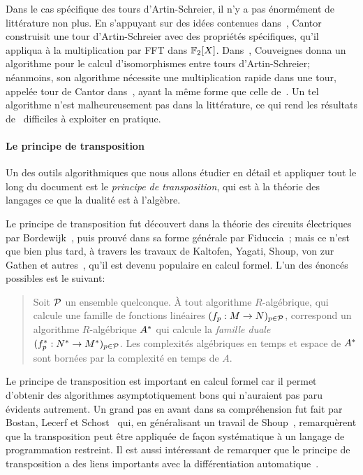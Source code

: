 Dans le cas spécifique des tours d'Artin-Schreier, il n'y a pas
énormément de littérature non plus. En s'appuyant sur des idées
contenues dans~\cite{Conway:ONAG2000}, Cantor~\cite{cantor89}
construisit une tour d'Artin-Schreier avec des propriétés spécifiques,
qu'il appliqua à la multiplication par FFT dans
$\mathbb{F}_2[X]$. Dans~\cite{couveignes00}, Couveignes donna un algorithme pour
le calcul d'isomorphismes entre tours d'Artin-Schreier; néanmoins, son
algorithme nécessite une multiplication rapide dans une tour, appelée
\og{}tour de Cantor\fg{} dans~\cite{couveignes00}, ayant la même forme que
celle de~\cite{cantor89}. Un tel algorithme n'est malheureusement pas
dans la littérature, ce qui rend les résultats de~\cite{couveignes00}
difficiles à exploiter en pratique.

\paragraph*{Le principe de transposition}
Un des outils algorithmiques que nous allons étudier en détail et
appliquer tout le long du document est le \emph{principe de
  transposition}, qui est à la théorie des langages ce que la dualité
est à l'algèbre.

Le principe de transposition fut découvert dans la théorie des
circuits électri\-ques par Bordewijk~\cite{bordewijk57}, puis prouvé
dans sa forme générale par Fiduccia~\cite{fiduccia:phd}; mais ce n'est
que bien plus tard, à travers les travaux de Kaltofen, Yagati, Shoup,
von zur Gathen et
autres~\cite{kaltofen+lakshman89,vzgathen+shoup92,shoup94,shoup95,shoup99,hanrot+quercia+zimmermann},
qu'il est devenu populaire en calcul formel. L'un des énoncés
possibles est le suivant:
\begin{quote}
  Soit $\mathcal{P}$ un ensemble quelconque. À tout algorithme
  $R$-algébrique, qui calcule une famille de fonctions linéaires
  $(f_p:M\rightarrow N)_{p\in\mathcal{P}}$, correspond un algorithme
  $R$-algébrique $A^\ast$ qui calcule la \emph{famille duale}
  $(f^\ast_p:N^\ast\rightarrow M^\ast)_{p\in\mathcal{P}}$. Les complexités
  algébriques en temps et espace de $A^\ast$ sont bornées par la
  complexité en temps de $A$.
\end{quote}

Le principe de transposition est important en calcul formel car il
permet d'obtenir des algorithmes asymptotiquement bons qui n'auraient
pas paru évi\-dents autrement. Un grand pas en avant dans sa
compréhension fut fait par Bostan, Lecerf et
Schost~\cite{bostan+lecerf+schost:tellegen} qui, en généralisant un
travail de Shoup~\cite{shoup95}, remarquèrent que la transposition
peut être appliquée de façon systématique à un langage de
programmation restreint. Il est aussi intéressant de remarquer que le
principe de transposition a des liens importants avec la
différentiation
automatique~\cite{baur+strassen83,kaltofen+lakshman89,Ka2K,gashkov+gashkov05,sergeev08}.

